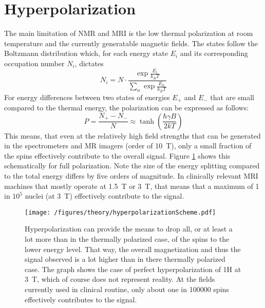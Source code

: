     \section{Hyperpolarization}
    \label{sec:theory:HP}
        The main limitation of NMR and MRI is the low thermal polarization at room temperature and the currently generatable magnetic fields. The states follow the Boltzmann distribution \cite{canet_para-hydrogen_2006} which, for each energy state $E_i$ and its corresponding occupation number $N_i$, dictates
        \begin{equation}
            N_i = N \cdot\frac{\exp{\frac{E_i}{k_B T}}}{\sum_n\exp{\frac{E_n}{k_BT}}}
        \end{equation}
        For energy differences between two states of energies $E_+$ and $E_-$ that are small compared to the thermal energy, the polarization can be expressed as follows:
        \begin{equation}
            P = \frac{N_+-N_-}{N} \approx \tanh\left(\frac{\hbar \gamma B}{2 k T }\right)
            \label{equation:theory:polarization}
        \end{equation}
        This means, that even at the relatively high field strengths that can be generated in the spectrometers and MR imagers (order of \SI{10}{\tesla}), only a small fraction of the spins effectively contribute to the overall signal. Figure \ref{figure:theory:boltzmannDistribution} shows this schematically for full polarization. Note the size of the energy splitting compared to the total energy differs by five orders of magnitude. In clinically relevant MRI machines that mostly operate at \SI{1.5}{\tesla} or \SI{3}{\tesla}, that means that a maximum of 1 in $10^5$ nuclei (at \SI{3}{\tesla}) effectively contribute to the signal.
        \begin{figure}
            \centering
            \texttt{[image: /figures/theory/hyperpolarizationScheme.pdf]}
            \caption[Hyperpolarization scheme]{Hyperpolarization can provide the means to drop all, or at least a lot more than in the thermally polarized case, of the spins to the lower energy level. That way, the overall magnetization and thus the signal observed is a lot higher than in there thermally polarized case. The graph shows the case of perfect hyperpolarization of 1H at \SI{3}{\tesla}, which of course does not represent reality. At the fields currently used in clinical routine, only about one in 100000 spins effectively contributes to the signal.}
            \label{figure:theory:boltzmannDistribution}
        \end{figure}
